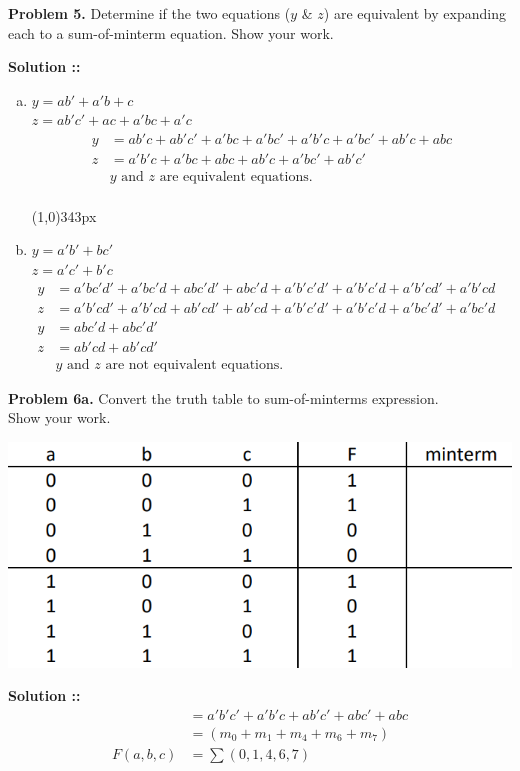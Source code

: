 \documentclass[11pt]{article}
\begin{document}

\textbf{Problem 5.} Determine if the two equations ($y$ \& $z$) are equivalent by 
expanding each to a sum-of-minterm equation. Show your work. 

\vspace{5px}\textbf{Solution ::}
\begin{enumerate}[a)]
    \item 
    $y = ab'+a'b+c$ \\
    $z = ab'c'+ac+a'bc+a'c$
    \begin{align*}
        y &= ab'c+ab'c'+a'bc+a'bc'+a'b'c+a'bc'+ab'c+abc \\
        z &= a'b'c+a'bc+abc+ab'c+a'bc'+ab'c' \\
        &\text{$y$ and $z$ are equivalent equations.}
    \end{align*}
    \\\line(1,0){343px}

    \item 
    $y = a'b'+bc'$ \\
    $z = a'c'+b'c$
    \begin{align*}
        y &= a'bc'd' + a'bc'd + abc'd' + abc'd + a'b'c'd' + a'b'c'd + a'b'cd'
        + a'b'cd \\
        z &= a'b'cd' + a'b'cd + ab'cd' + ab'cd + a'b'c'd' + a'b'c'd + a'bc'd' + a'bc'd
        & \\
        y &= abc'd + abc'd' \\
        z &= ab'cd + ab'cd' \\
        &\text{$y$ and $z$ are not equivalent equations.}
    \end{align*}
\end{enumerate}
\pagebreak


\textbf{Problem 6a.} Convert the truth table to sum-of-minterms expression.\\
Show your work.
\begin{center}
    \includegraphics[scale=0.7]{6a.png}
\end{center}
\textbf{Solution ::}
\begin{align*}
    &= a'b'c' + a'b'c + ab'c' + abc' + abc\\
    &=(m_0 + m_1 + m_4 + m_6 + m_7) \\
    F(a,b,c) &= \sum \left(0, 1, 4, 6, 7\right)
\end{align*}
\pagebreak
\end{document}
